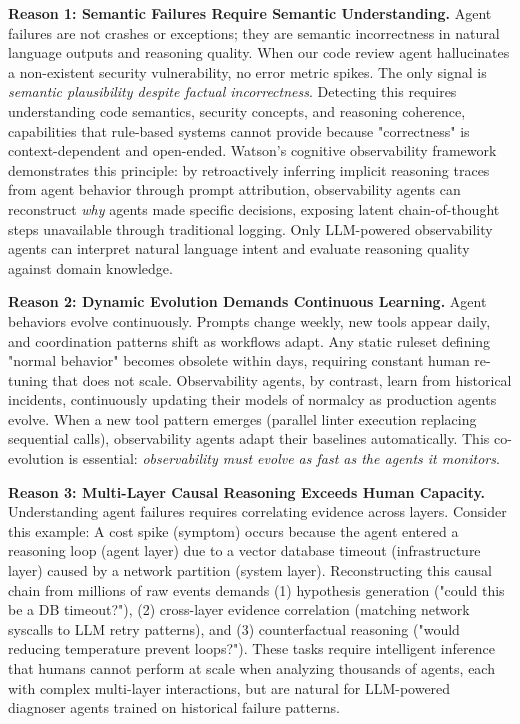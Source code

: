 \documentclass[sigplan,screen,9pt]{acmart}
\begin{document}
\textbf{Reason 1: Semantic Failures Require Semantic Understanding.} Agent failures are not crashes or exceptions; they are semantic incorrectness in natural language outputs and reasoning quality. When our code review agent hallucinates a non-existent security vulnerability, no error metric spikes. The only signal is \emph{semantic plausibility despite factual incorrectness}. Detecting this requires understanding code semantics, security concepts, and reasoning coherence, capabilities that rule-based systems cannot provide because "correctness" is context-dependent and open-ended. Watson's cognitive observability framework~\cite{Rombaut2025Watson} demonstrates this principle: by retroactively inferring implicit reasoning traces from agent behavior through prompt attribution, observability agents can reconstruct \emph{why} agents made specific decisions, exposing latent chain-of-thought steps unavailable through traditional logging. Only LLM-powered observability agents can interpret natural language intent and evaluate reasoning quality against domain knowledge.

\textbf{Reason 2: Dynamic Evolution Demands Continuous Learning.} Agent behaviors evolve continuously. Prompts change weekly, new tools appear daily, and coordination patterns shift as workflows adapt. Any static ruleset defining "normal behavior" becomes obsolete within days, requiring constant human re-tuning that does not scale. Observability agents, by contrast, learn from historical incidents, continuously updating their models of normalcy as production agents evolve. When a new tool pattern emerges (parallel linter execution replacing sequential calls), observability agents adapt their baselines automatically. This co-evolution is essential: \emph{observability must evolve as fast as the agents it monitors}.

\textbf{Reason 3: Multi-Layer Causal Reasoning Exceeds Human Capacity.} Understanding agent failures requires correlating evidence across layers. Consider this example: A cost spike (symptom) occurs because the agent entered a reasoning loop (agent layer) due to a vector database timeout (infrastructure layer) caused by a network partition (system layer). Reconstructing this causal chain from millions of raw events demands (1) hypothesis generation ("could this be a DB timeout?"), (2) cross-layer evidence correlation (matching network syscalls to LLM retry patterns), and (3) counterfactual reasoning ("would reducing temperature prevent loops?"). These tasks require intelligent inference that humans cannot perform at scale when analyzing thousands of agents, each with complex multi-layer interactions, but are natural for LLM-powered diagnoser agents trained on historical failure patterns.
\end{document}
